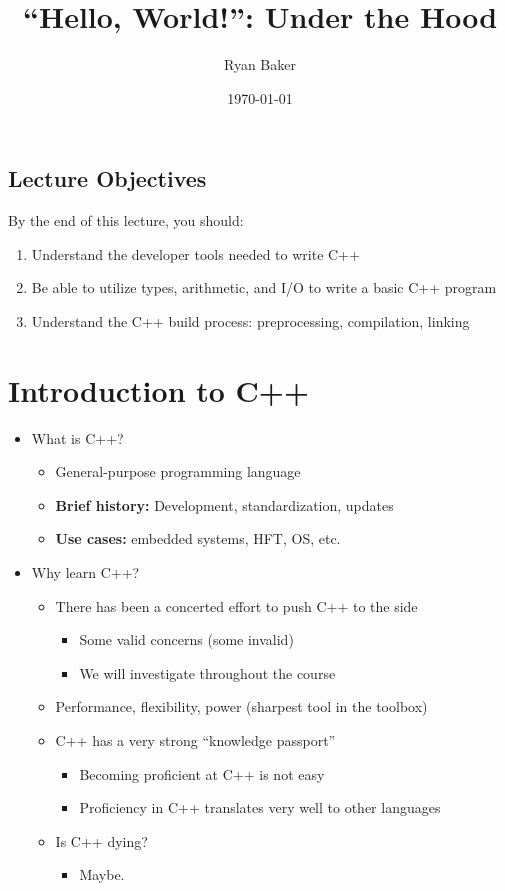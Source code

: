 \documentclass{article}
\title{``Hello, World!'': Under the Hood}
\author{Ryan Baker}
\date{\today}
\begin{document}
\maketitle
\tableofcontents
\pagebreak

\subsection*{Lecture Objectives}

\noindent
By the end of this lecture, you should:

\begin{enumerate}
	\item Understand the developer tools needed to write C++
	\item Be able to utilize types, arithmetic, and I/O to write a basic C++ program
	\item Understand the C++ build process: preprocessing, compilation, linking
\end{enumerate}

\section{Introduction to C++}

\begin{itemize}
	\item What is C++? \begin{itemize}
		\item General-purpose programming language
		\item \textbf{Brief history:} Development, standardization, updates
		\item \textbf{Use cases:} embedded systems, HFT, OS, etc.
	\end{itemize}
	\item Why learn C++? \begin{itemize}
		\item There has been a concerted effort to push C++ to the side \begin{itemize}
			\item Some valid concerns (some invalid)
			\item We will investigate throughout the course
		\end{itemize}
		\item Performance, flexibility, power (sharpest tool in the toolbox)
		\item C++ has a very strong ``knowledge passport'' \begin{itemize}
			\item Becoming proficient at C++ is not easy
			\item Proficiency in C++ translates very well to other languages
		\end{itemize}
		\item Is C++ dying? \begin{itemize}
			\item Maybe.
		\end{itemize}
	\end{itemize}
\end{itemize}
\end{document}
